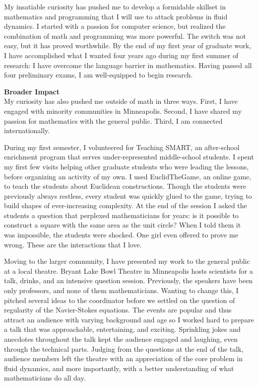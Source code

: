 \documentclass[12pt]{article}
\begin{document}
My insatiable curiosity has pushed me to develop a formidable skillset in mathematics and programming that I will use to attack problems in fluid dynamics. I started with a passion for computer science, but realized the combination of math and programming was more powerful. The switch was not easy, but it has proved worthwhile. By the end of my first year of graduate work, I have accomplished what I wanted four years ago during my first summer of research: I have overcome the language barrier in mathematics. Having passed all four preliminary exams, I am well-equipped to begin research.

\textbf{Broader Impact}\\
My curiosity has also pushed me outside of math in three ways. First, I have engaged with minority communities in Minneapolis. Second, I have shared my passion for mathematics with the general public. Third, I am connected internationally. 

During my first semester, I volunteered for Teaching SMART, an after-school enrichment program that serves under-represented middle-school students. I spent my first few visits helping other graduate students who were leading the lessons, before organizing an activity of my own. I used EuclidTheGame, an online game, to teach the students about Euclidean constructions. Though the students were previously always restless, every student was quickly glued to the game, trying to build shapes of ever-increasing complexity. At the end of the session I asked the students a question that perplexed mathematicians for years: is it possible to construct a square with the same area as the unit circle? When I told them it was impossible, the students were shocked. One girl even offered to prove me wrong. These are the interactions that I love. 

Moving to the larger community, I have presented my work to the general public at a local theatre. Bryant Lake Bowl Theatre in Minneapolis hosts scientists for a talk, drinks,  and an intensive question session. Previously, the speakers have been only professors, and none of them mathematicians. Wanting to change this, I pitched several ideas to the coordinator before we settled on the question of regularity of the Navier-Stokes equations. The events are popular and thus attract an audience with varying background and age so I worked hard to prepare a talk that was approachable, entertaining, and exciting. Sprinkling jokes and anecdotes throughout the talk kept the audience engaged and laughing, even through the technical parts. Judging from the questions at the end of the talk, audience members left the theatre with an appreciation of the core problem in fluid dynamics, and more importantly, with a better understanding of what mathematicians do all day.
\end{document}
